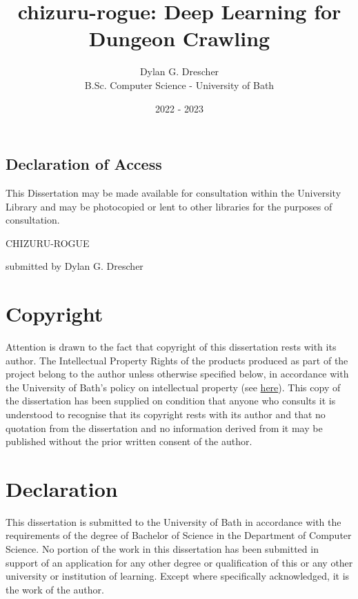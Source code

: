 \documentclass[12pt,a4paper]{article}
\begin{document}
    \title{chizuru-rogue: Deep Learning for Dungeon Crawling}
    \author{Dylan G. Drescher \\[1ex] B.Sc. Computer Science - University of Bath}
    \date{2022 - 2023}
    \maketitle

    \setcounter{page}{0}
    \thispagestyle{empty}

    \newpage

    \begin{center}
        \section*{Declaration of Access}

        This Dissertation may be made available for consultation within the University Library and may be photocopied or lent to other libraries for the purposes of consultation.
    \end{center}

    \newpage

    CHIZURU-ROGUE

    submitted by Dylan G. Drescher

    \section*{Copyright}
    Attention is drawn to the fact that copyright of this dissertation rests with its author.
    The Intellectual Property Rights of the products produced as part of the project belong to the author unless otherwise specified below, in accordance with the University of Bath's policy on intellectual property (see \href{https://www.bath.ac.uk/publications/university-ordinances/attachments/Ordinances_1_October_2020.pdf}{here}).
    This copy of the dissertation has been supplied on condition that anyone who consults it is understood to recognise that its copyright rests with its author and that no quotation from the dissertation and no information derived from it may be published without the prior written consent of the author.

    \section*{Declaration}
    This dissertation is submitted to the University of Bath in accordance with the requirements of the degree of Bachelor of Science in the Department of Computer Science.
    No portion of the work in this dissertation has been submitted in support of an application for any other degree or qualification of this or any other university or institution of learning.
    Except where specifically acknowledged, it is the work of the author.
\end{document}
